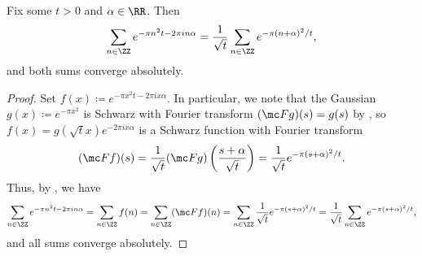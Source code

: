 \documentclass[../notes.tex]{subfiles}
\begin{document}
\begin{corollary} \label{cor:use-ps}
	Fix some $t>0$ and $\alpha\in\RR$. Then
	\[\sum_{n\in\ZZ}e^{-\pi n^2t-2\pi in\alpha}=\frac1{\sqrt t}\sum_{n\in\ZZ}e^{-\pi(n+\alpha)^2/t},\]
	and both sums converge absolutely.
\end{corollary}
\begin{proof}
	Set $f(x)\coloneqq e^{-\pi x^2t-2\pi ix\alpha}$. In particular, we note that the Gaussian $g(x)\coloneqq e^{-\pi x^2}$ is Schwarz with Fourier transform $(\mc Fg)(s)=g(s)$ by , so $f(x)=g(\sqrt tx)e^{-2\pi ix\alpha}$ is a Schwarz function with Fourier transform
	\[(\mc Ff)(s)=\frac1{\sqrt t}(\mc Fg)\left(\frac{s+\alpha}{\sqrt t}\right)=\frac1{\sqrt t}e^{-\pi(s+\alpha)^2/t}.\]
	Thus, by , we have
	\[\sum_{n\in\ZZ}e^{-\pi n^2t-2\pi in\alpha}=\sum_{n\in\ZZ}f(n)=\sum_{n\in\ZZ}(\mc Ff)(n)=\sum_{n\in\ZZ}\frac1{\sqrt t}e^{-\pi(s+\alpha)^2/t}=\frac1{\sqrt t}\sum_{n\in\ZZ}e^{-\pi(s+\alpha)^2/t},\]
	and all sums converge absolutely.
\end{proof}
\end{document}
